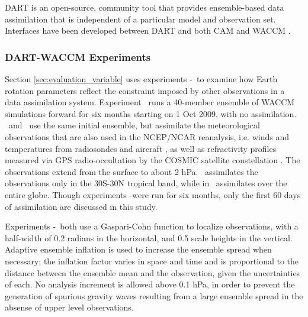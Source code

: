 DART \citep{Anderson2009} is an open-source, community tool that provides ensemble-based data assimilation that is independent of a particular model and observation set.
Interfaces have been developed between DART and both CAM \citep{Raeder2012} and WACCM \citep{Pedatella2013}.

\subsubsection{DART-WACCM Experiments}
Section \ref{sec:evaluation_variable} uses experiments \WACCMNODA-\WACCMGLOBAL~to examine how Earth rotation parameters reflect the constraint imposed by other observations in a data assimilation system.  
Experiment \WACCMNODA~runs a 40-member ensemble of WACCM simulations forward for six months starting on 1 Oct 2009, with no assimilation. 
\WACCMTROPICS~and \WACCMGLOBAL~use the same initial ensemble, but assimilate the meteorological observations that are also used in the NCEP/NCAR reanalysis, i.e. winds and temperatures from radiosondes and aircraft \citep{Saha2010}, as well as refractivity profiles measured via GPS radio-occultation by the COSMIC satellite constellation \citep{Anthes2008}.
The observations extend from the surface to about 2 hPa. 
\WACCMTROPICS~assimilates the observations only in the 30S-30N tropical band, while in \WACCMGLOBAL~assimilates over the entire globe.
Though experiments \WACCMNODA-\WACCMGLOBAL were run for six months, only the first 60 days of assimilation are discussed in this study.  

Experiments \WACCMTROPICS-\WACCMGLOBAL~both use a Gaspari-Cohn function \citep{Gaspari1999} to localize observations, with a half-width of 0.2 radians in the horizontal, and 0.5 scale heights in the vertical.  
Adaptive ensemble inflation \citep{Anderson2009tellus} is used to increase the ensemble spread when necessary; the inflation factor varies in space and time and is proportional to the distance between the ensemble mean and the observation, given the uncertainties of each.  
No analysis increment is allowed above 0.1 hPa, in order to prevent the generation of spurious gravity waves resulting from a large ensemble spread in the absense of upper level observations. 


